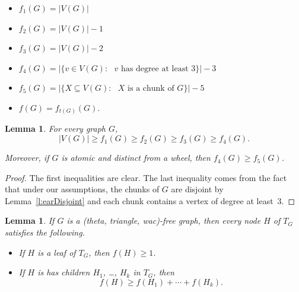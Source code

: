 \documentclass[11pt]{article}
\newtheorem{lemma}[theo]{Lemma}
\begin{document}
\begin{itemize}
    \item $f_1(G) = |V(G)|$
    \item $f_2(G) = |V(G)| - 1$
    \item $f_3(G) = |V(G)| - 2$
    \item $f_4(G) = |\{v\in V(G) : \text{ $v$ has degree at least 3}\}| - 3$
    \item $f_5(G) = |\{X \subseteq V(G) : \text{ $X$ is a chunk of $G$}\}| - 5$
    \item $f(G) = f_{t(G)}(G)$.  
\end{itemize}

\begin{lemma}
  \label{l:f-monotonous}
  For every graph $G$, $$|V(G)| \geq f_1(G) \geq f_2(G) \geq f_3(G) \geq f_4(G).$$

  Moreover, if $G$ is atomic and distinct from a wheel, then $f_4(G) \geq f_5(G)$.
\end{lemma}

\begin{proof}
  The first inequalities are clear. 
  The last inequality comes from the fact that under our assumptions, the chunks of $G$ are disjoint by Lemma~\ref{l:earDisjoint} and each chunk contains a vertex of degree at least~3.
\end{proof}

\begin{lemma}
  \label{l:share}
  If $G$ is a (theta, triangle, wac)-free graph, then every node $H$ of $T_G$ satisfies  the following. 
  \begin{itemize}
    \item If $H$ is a leaf of $T_G$, then $f(H) \geq 1$. 
    \item If $H$ is has children $H_1$, \dots, $H_k$ in $T_G$, then $$f(H) \geq f(H_1) + \cdots + f(H_k).$$ 
  \end{itemize}
\end{lemma}
\end{document}
